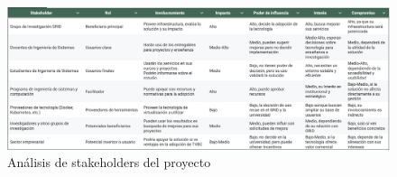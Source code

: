 \begin{figure}[H]
    \centering
    \includegraphics[width=\textwidth] {tablas/cp1/definicionStakeholders.png}
    \caption{Análisis de stakeholders del proyecto}\label{fig:tabla-stakeholders}
\end{figure}